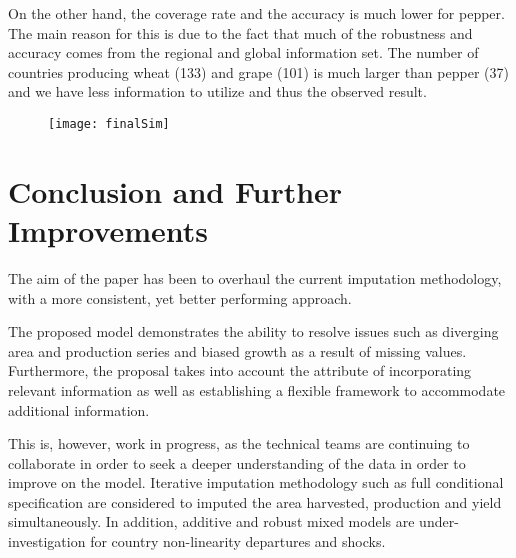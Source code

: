 \documentclass[nojss]{jss}\usepackage[]{graphicx}\usepackage[]{color}
\begin{document}
On the other hand, the coverage rate and the accuracy is much lower
for pepper. The main reason for this is due to the fact that much of
the robustness and accuracy comes from the regional and global
information set. The number of countries producing wheat
(133)
and grape (101) is much larger than pepper
(37)
and we have less information to utilize and thus the observed result.


\begin{figure}[ht!]
  \centering
  \texttt{[image: finalSim]}
\end{figure}







\FloatBarrier
\section{Conclusion and Further Improvements}
The aim of the paper has been to overhaul the current imputation
methodology, with a more consistent, yet better performing approach.

The proposed model demonstrates the ability to resolve issues such as
diverging area and production series and biased growth as a result of
missing values. Furthermore, the proposal takes into account the
attribute of incorporating relevant information as well as
establishing a flexible framework to accommodate additional
information.

This is, however, work in progress, as the technical teams are
continuing to collaborate in order to seek a deeper understanding of
the data in order to improve on the model. Iterative imputation
methodology such as full conditional specification are considered to
imputed the area harvested, production and yield simultaneously.  In
addition, additive and robust mixed models are under-investigation for
country non-linearity departures and shocks.
\end{document}
